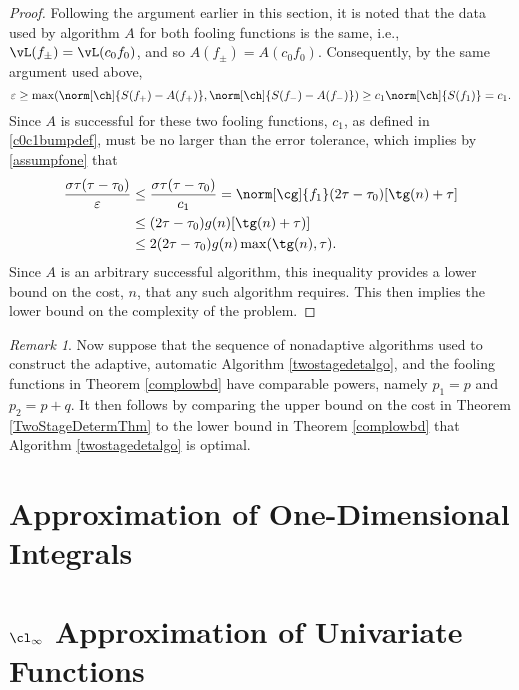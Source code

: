 \documentclass[final]{elsarticle}
\theoremstyle{definition}
\theoremstyle{remark}
\newtheorem{rem}{Remark}
\begin{document}
\begin{proof}
Following the argument earlier in this section, it is noted that the data used by algorithm $A$ for both fooling functions is the same, i.e., $\vL(f_{\pm})=\vL(c_0f_0)$, and so $A(f_{\pm})=A(c_0f_0)$.  Consequently, by the same argument used above, 
\[
\varepsilon  \ge  \max(\norm[\ch]{S(f_+)-A(f_+)},\norm[\ch]{S(f_-)-A(f_-)}) \ge c_1 \norm[\ch]{S(f_1)}=c_1.
\]
Since $A$ is successful for these two fooling functions, $c_1$, as defined in \eqref{c0c1bumpdef}, must be no larger than the error tolerance, which implies by \eqref{assumpfone} that 
\begin{align*}
\frac{\sigma \tau(\tau-\tau_0)}{\varepsilon} & \le \frac{\sigma \tau(\tau-\tau_0)}{c_1}  = \norm[\cg]{f_1} (2\tau - \tau_0) [\tg(n) + \tau] \\
&\le (2\tau - \tau_0) g(n) [\tg(n) + \tau)] \\
&\le 2 (2\tau - \tau_0) g(n)\max( \tg(n), \tau).
\end{align*}
Since $A$ is an arbitrary successful algorithm, this inequality provides a lower bound on the cost, $n$, that any such algorithm requires.  This then implies the lower bound on the complexity of the problem.   
\end{proof}

\begin{rem} Now suppose that the sequence of nonadaptive algorithms used to construct the adaptive, automatic Algorithm \ref{twostagedetalgo}, and the fooling functions in Theorem \ref{complowbd} have comparable powers, namely $p_1=p$ and $p_2=p+q$.  It then follows by comparing the upper bound on the cost in Theorem \ref{TwoStageDetermThm} to the lower bound in Theorem \ref{complowbd} that Algorithm \ref{twostagedetalgo} is optimal. 
\end{rem}


\section{Approximation of One-Dimensional Integrals} \label{integsec}



\section{$\cl_{\infty}$ Approximation of Univariate Functions} \label{approxsec}








\end{document}
